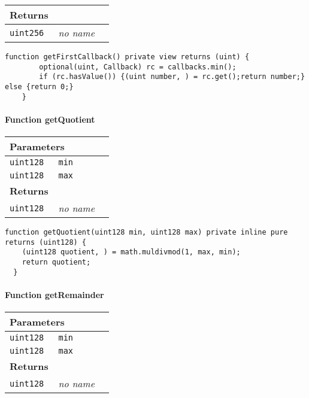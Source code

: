 \ifsoltables
\noindent\begin{tabular}{|l|l|p{5cm}|}\hline
\multicolumn{3}{|l|}{\bf Returns}\\\hline
\tt uint256 & {\em no name} &\\\hline
\end{tabular}
\fi

\vspace{2cm}

\begin{lstlisting}[firstnumber=242]
  function getFirstCallback() private view returns (uint) {
		optional(uint, Callback) rc = callbacks.min();
		if (rc.hasValue()) {(uint number, ) = rc.get();return number;} else {return 0;}
	}
\end{lstlisting}

\paragraph{Function getQuotient}


\ifsoltables
\noindent\begin{tabular}{|l|l|p{5cm}|}\hline
\multicolumn{3}{|l|}{\bf Parameters}\\\hline
\tt uint128 & \tt min &\\\hline
\tt uint128 & \tt max &\\\hline
\multicolumn{3}{|l|}{\bf Returns}\\\hline
\tt uint128 & {\em no name} &\\\hline
\end{tabular}
\fi

\vspace{2cm}

\begin{lstlisting}[firstnumber=165]
  function getQuotient(uint128 min, uint128 max) private inline pure returns (uint128) {
    (uint128 quotient, ) = math.muldivmod(1, max, min);
    return quotient;
  }
\end{lstlisting}

\paragraph{Function getRemainder}


\ifsoltables
\noindent\begin{tabular}{|l|l|p{5cm}|}\hline
\multicolumn{3}{|l|}{\bf Parameters}\\\hline
\tt uint128 & \tt min &\\\hline
\tt uint128 & \tt max &\\\hline
\multicolumn{3}{|l|}{\bf Returns}\\\hline
\tt uint128 & {\em no name} &\\\hline
\end{tabular}
\fi

